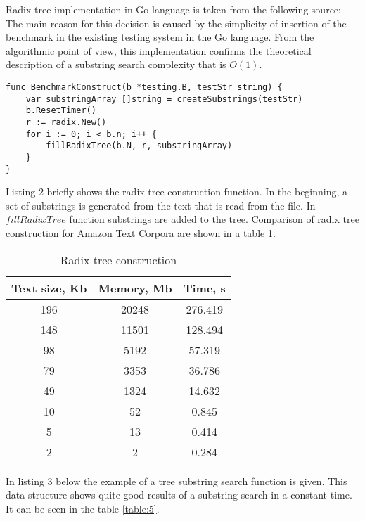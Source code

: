 Radix tree implementation in Go language is taken from the following source: \cite{golang2016sa}
The main reason for this decision is caused by the simplicity of insertion of the benchmark
in the existing testing system in the Go language.
From the algorithmic point of view, this implementation confirms the theoretical description of
a substring search complexity that is $O(1)$.

\newpage
\begin{lstlisting}[caption=Radix tree example]
func BenchmarkConstruct(b *testing.B, testStr string) {
	var substringArray []string = createSubstrings(testStr)
	b.ResetTimer()
	r := radix.New()
	for i := 0; i < b.n; i++ {
		fillRadixTree(b.N, r, substringArray)
	}
}
\end{lstlisting}

Listing 2 briefly shows the radix tree construction function.
In the beginning, a set of substrings is generated from the text that is read from the file.
In $fillRadixTree$ function substrings are added to the tree. Comparison of
radix tree construction for Amazon Text Corpora \cite{amazon2013text} are shown in a table \ref{table:4}.


\begin{table}[ht!]
    \centering
    \begin{tabular}{|c|c|c|}
        \hline
        Text size, Kb & Memory, Mb & Time, s\\
        \hline
        196 & 20248 & 276.419\\
        \hline
        148 & 11501 & 128.494\\
        \hline
        98 & 5192 & 57.319\\
        \hline
        79 & 3353 & 36.786\\
        \hline
        49 & 1324 & 14.632\\
        \hline
        10 & 52 & 0.845\\
        \hline
        5 & 13 & 0.414\\
        \hline
        2 & 2 & 0.284\\
        \hline
    \end{tabular}
    \caption{Radix tree construction}
    \label{table:4}
\end{table}

In listing 3 below the example of a tree substring search function is given.
This data structure shows quite good results of a substring search in a constant time.
It can be seen in the table \ref{table:5}.

